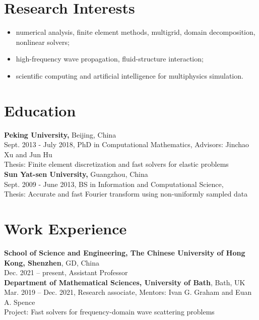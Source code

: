 \documentclass[letterpaper]{article}
\begin{document}
\section*{Research Interests}
\begin{itemize}[leftmargin=*]
\item numerical analysis,  finite element methods, multigrid, domain decomposition,  nonlinear solvers; 
\item high-frequency wave propagation,  fluid-structure interaction; 
 \item  scientific computing and artificial intelligence for multiphysics  simulation.
\end{itemize}

\section*{Education}

\textbf{%
Peking University,} Beijing, China\\
\quad \quad Sept. 2013 - July 2018,  \quad\quad  PhD  in Computational Mathematics,  \quad %
Advisors:  { Jinchao Xu and Jun Hu } \\
Thesis: Finite element discretization and fast solvers for elastic problems
\\

\textbf{Sun Yat-sen University,} Guangzhou, China\\
\quad \quad Sept. 2009 - June 2013, \quad \quad BS in Information and Computational Science, %
\\
Thesis: Accurate and fast Fourier transform using non-uniformly sampled data

\section*{Work Experience}
\textbf{School  of Science and Engineering, The Chinese University of Hong Kong, Shenzhen}, GD, China\\
\quad\quad Dec. 2021 -- present,  \quad\quad  Assistant Professor\\

\textbf{Department  of Mathematical Sciences, University of Bath}, Bath, UK\\
\quad \quad Mar. 2019 -- Dec. 2021, \quad\quad  Research associate, \quad \quad Mentors:  Ivan G. Graham and Euan A. Spence\\
Project: Fast solvers for frequency-domain wave scattering problems\\
\end{document}
